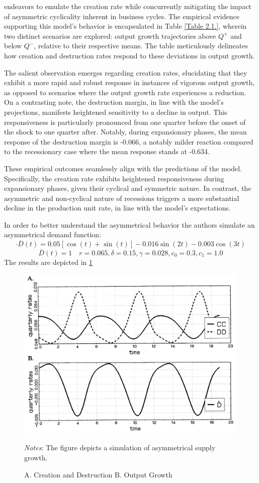\documentclass[12pt]{report}
\begin{document}
endeavors to emulate the creation rate while concurrently mitigating the impact of asymmetric cyclicality inherent in
business cycles. The empirical evidence supporting this model's behavior is encapsulated in Table \ref{Table 2.1.},
wherein two distinct scenarios are explored: output growth trajectories above \(Q^+\) and below \(Q^-\), relative to
their respective means. The table meticulously delineates how creation and destruction rates respond to these deviations
in output growth. 
\par
The salient observation emerges regarding creation rates, elucidating that they exhibit a more rapid and robust response
in instances of vigorous output growth, as opposed to scenarios where the output growth rate experiences a reduction. On
a contrasting note, the destruction margin, in line with the model's projections, manifests heightened sensitivity to a
decline in output. This responsiveness is particularly pronounced from one quarter before the onset of the shock to one
quarter after. Notably, during expansionary phases, the mean response of the destruction margin is -0.066, a notably
milder reaction compared to the recessionary case where the mean response stands at -0.634. 
\par
These empirical outcomes seamlessly align with the predictions of the model. Specifically, the creation rate exhibits
heightened responsiveness during expansionary phases, given their cyclical and symmetric nature. In contrast, the
asymmetric and non-cyclical nature of recessions triggers a more substantial decline in the production unit rate, in
line with the model's expectations. 
\par 
In order to better understand the asymmetrical behavior the authors simulate an asymmetrical demand function:
\[\cdot{\overline{D}}(t)=0.05[\cos(t)+\sin(t)] - 0.016 \sin(2t)-0.003\cos(3t)\]
\[\overline{D}(t)=1\quad r = 0.065, \delta =0.15, \gamma=0.028, c_0=0.3, c_1=1.0\] 
The results are depicted in \ref{plot:2.4}
\begin{figure}
    \centering
    \includegraphics[scale = 0.4]{figure/Plot2.4.png}
    \caption{A.  Creation and  Destruction B. Output Growth}
    \label{plot:2.4}
    \footnotesize \textit{Notes}: The figure depicts a simulation of asymmetrical supply growth.
\end{figure}
\end{document}
